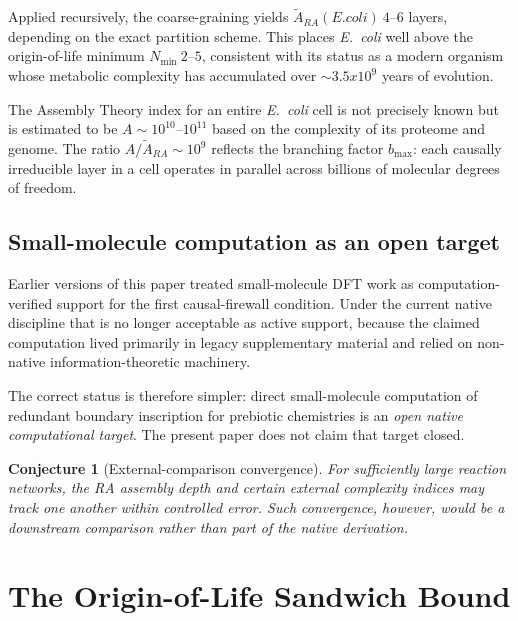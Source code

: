 \documentclass[11pt]{article}
\def\mathrm#1{#1}%
\def\text#1{#1}%
\def\times{x}%
\def\approx{~}%
\newtheorem{conjecture}{Conjecture}
\begin{document}
Applied recursively, the coarse-graining yields $\tilde{A}_{\mathrm{RA}}(\text{E. coli}) \approx 4$--$6$ layers, depending on the exact partition scheme. This places \emph{E.~coli} well above the origin-of-life minimum $N_{\min} \approx 2$--$5$, consistent with its status as a modern organism whose metabolic complexity has accumulated over $\sim 3.5 \times 10^9$ years of evolution.

The Assembly Theory index for an entire \emph{E.~coli} cell is not precisely known but is estimated to be $A \sim 10^{10}$--$10^{11}$ based on the complexity of its proteome and genome. The ratio $A / \tilde{A}_{\mathrm{RA}} \sim 10^9$ reflects the branching factor $b_{\max}$: each causally irreducible layer in a cell operates in parallel across billions of molecular degrees of freedom.

\subsection{Small-molecule computation as an open target}
\label{sec:dft}

Earlier versions of this paper treated small-molecule DFT work as computation-verified support for the first causal-firewall condition. Under the current native discipline that is no longer acceptable as active support, because the claimed computation lived primarily in legacy supplementary material and relied on non-native information-theoretic machinery.

The correct status is therefore simpler: direct small-molecule computation of redundant boundary inscription for prebiotic chemistries is an \emph{open native computational target}. The present paper does not claim that target closed.

\begin{conjecture}[External-comparison convergence]
For sufficiently large reaction networks, the RA assembly depth and certain external complexity indices may track one another within controlled error. Such convergence, however, would be a downstream comparison rather than part of the native derivation.
\end{conjecture}

\section{The Origin-of-Life Sandwich Bound}
\label{sec:sandwich}
\end{document}
